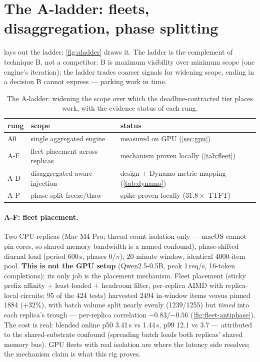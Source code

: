 \documentclass[11pt]{article}
\begin{document}



\clearpage

\section{The A-ladder: fleets, disaggregation, phase splitting}
\label{app:ladder}

 lays out the ladder; \cref{fig:aladder} draws it. The ladder is the
complement of technique B, not a competitor: B is maximum visibility over minimum scope
(one engine's iteration); the ladder trades coarser signals for widening scope, ending
in a decision B cannot express --- parking work in time.

\begin{table}[!htbp]
\centering
\caption{The A-ladder: widening the scope over which the deadline-contracted tier
places work, with the evidence status of each rung.}
\label{tab:taxonomy}
\begin{tabular}{ll>{\raggedright\arraybackslash}p{6.6cm}}
\toprule
rung & scope & status \\
\midrule
A0  & single aggregated engine        & measured on GPU (\cref{sec:gpu}) \\
A-F & fleet placement across replicas & mechanism proven locally (\cref{tab:fleet}) \\
A-D & disaggregated-aware injection   & design $+$ Dynamo metric mapping (\cref{tab:dynamo}) \\
A-P & phase-split freeze/thaw         & spike-proven locally ($31.8\times$ TTFT) \\
\bottomrule
\end{tabular}
\end{table}



\paragraph{A-F: fleet placement.} Two CPU replicas (Mac M4 Pro; thread-count isolation
only --- macOS cannot pin cores, so shared memory bandwidth is a named confound),
phase-shifted diurnal load (period 600\,s, phases $0$/$\pi$), 20-minute window,
identical 4000-item pool. \textbf{This is not the GPU setup} (Qwen2.5-0.5B, peak
1\,req/s, 16-token completions); its only job is the placement mechanism. Fleet
placement (sticky prefix affinity $+$ least-loaded $+$ headroom filter, per-replica AIMD
with replica-local circuits; 95 of the 424 tests) harvested 2494 in-window items versus
pinned 1884 ($+32\%$), with batch volume split nearly evenly (1239/1255) but \emph{timed}
into each replica's trough --- per-replica correlation $-0.83$/$-0.56$
(\cref{fig:fleet-antiphase}). The cost is real: blended online p50 3.41\,s vs 1.44\,s,
p99 12.1 vs 3.7 --- attributed to the shared-substrate confound (spreading batch loads
both replicas' shared memory bus). GPU fleets with real isolation are where the latency
side resolves; the mechanism claim is what this rig proves.
\end{document}
